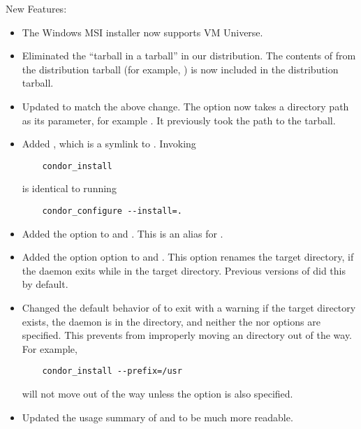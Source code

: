 \noindent New Features:

\begin{itemize}

\item The Windows MSI installer now supports VM Universe.

\item Eliminated the ``tarball in a tarball'' in our distribution.
  The contents of  from the distribution tarball
  (for example, ) is now
  included in the distribution tarball.

\item Updated  to match the above change.  The
   option now takes a directory path as its parameter,
  for example .
  It previously took the path to
  the  tarball.

\item Added , which is a symlink to .
  Invoking 
\begin{verbatim}
    condor_install
\end{verbatim}
  is identical to running
\begin{verbatim}
    condor_configure --install=.
\end{verbatim}

\item Added the option  to  and
  .  This is an alias for .

\item Added the option  option to  and
  .  This option renames the target  directory,
  if the  daemon exits while in the target  directory.
  Previous versions of  did this by default.

\item Changed the default behavior of  to exit with a
  warning if the target  directory exists,
  the  daemon is in the  directory,
  and neither the  nor  options are specified.
  This prevents  from improperly moving an 
  directory out of the way.
  For example,
\begin{verbatim}
    condor_install --prefix=/usr
\end{verbatim}
  will not move  out of the way unless
  the  option is also specified.

\item Updated the usage summary of  and
   to be much more readable.

\end{itemize}

